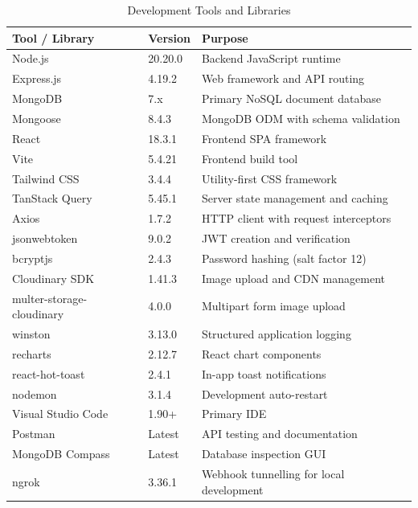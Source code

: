 \documentclass[12pt,a4paper]{report}
\renewcommand{\arraystretch}{1.2}
\begin{document}
\begin{table}[H]
\centering
\caption{Development Tools and Libraries}
\renewcommand{\arraystretch}{1.3}
\begin{tabularx}{\textwidth}{|l|l|X|}
\hline
\textbf{Tool / Library} & \textbf{Version} & \textbf{Purpose} \\
\hline
Node.js & 20.20.0 & Backend JavaScript runtime \\
\hline
Express.js & 4.19.2 & Web framework and API routing \\
\hline
MongoDB & 7.x & Primary NoSQL document database \\
\hline
Mongoose & 8.4.3 & MongoDB ODM with schema validation \\
\hline
React & 18.3.1 & Frontend SPA framework \\
\hline
Vite & 5.4.21 & Frontend build tool \\
\hline
Tailwind CSS & 3.4.4 & Utility-first CSS framework \\
\hline
TanStack Query & 5.45.1 & Server state management and caching \\
\hline
Axios & 1.7.2 & HTTP client with request interceptors \\
\hline
jsonwebtoken & 9.0.2 & JWT creation and verification \\
\hline
bcryptjs & 2.4.3 & Password hashing (salt factor 12) \\
\hline
Cloudinary SDK & 1.41.3 & Image upload and CDN management \\
\hline
multer-storage-cloudinary & 4.0.0 & Multipart form image upload \\
\hline
winston & 3.13.0 & Structured application logging \\
\hline
recharts & 2.12.7 & React chart components \\
\hline
react-hot-toast & 2.4.1 & In-app toast notifications \\
\hline
nodemon & 3.1.4 & Development auto-restart \\
\hline
Visual Studio Code & 1.90+ & Primary IDE \\
\hline
Postman & Latest & API testing and documentation \\
\hline
MongoDB Compass & Latest & Database inspection GUI \\
\hline
ngrok & 3.36.1 & Webhook tunnelling for local development \\
\hline
\end{tabularx}
\end{table}

\end{document}
